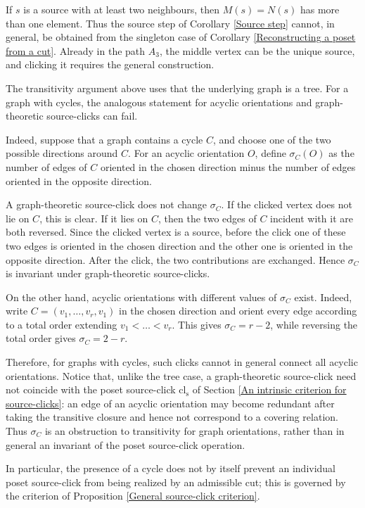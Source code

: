 \begin{remark}
    If $s$ is a source with at least two neighbours, then $M(s)=N(s)$ has more than one element. Thus the source step of Corollary \ref{Source step} cannot, in general, be obtained from the singleton case of Corollary \ref{Reconstructing a poset from a cut}. Already in the path $A_3$, the middle vertex can be the unique source, and clicking it requires the general construction.
\end{remark}

\begin{remark}
   The transitivity argument above uses that the underlying graph is a tree. For a graph with cycles, the analogous statement for acyclic orientations and graph-theoretic source-clicks can fail.

   Indeed, suppose that a graph contains a cycle $C$, and choose one of the two possible directions around $C$. For an acyclic orientation $O$, define $\sigma_C(O)$ as the number of edges of $C$ oriented in the chosen direction minus the number of edges oriented in the opposite direction. 

   A graph-theoretic source-click does not change $\sigma_C$. If the clicked vertex does not lie on $C$, this is clear. If it lies on $C$, then the two edges of $C$ incident with it are both reversed. Since the clicked vertex is a source, before the click one of these two edges is oriented in the chosen direction and the other one is oriented in the opposite direction. After the click, the two contributions are exchanged. Hence $\sigma_C$ is invariant under graph-theoretic source-clicks.

   On the other hand, acyclic orientations with different values of $\sigma_C$ exist. Indeed, write $C=(v_1, \dots, v_r,v_1)$ in the chosen direction and orient every edge according to a total order extending $v_1<\dots<v_r$. This gives $\sigma_C=r-2$, while reversing the total order gives $\sigma_C=2-r$.

   Therefore, for graphs with cycles, such clicks cannot in general connect all acyclic orientations. Notice that, unlike the tree case, a graph-theoretic source-click need not coincide with the poset source-click $\operatorname{cl_s}$ of Section \ref{An intrinsic criterion for source-clicks}: an edge of an acyclic orientation may become redundant after taking the transitive closure and hence not correspond to a covering relation. Thus $\sigma_C$ is an obstruction to transitivity for graph orientations, rather than in general an invariant of the poset source-click operation.

   In particular, the presence of a cycle does not by itself prevent an individual poset source-click from being realized by an admissible cut; this is governed by the criterion of Proposition \ref{General source-click criterion}.
\end{remark}